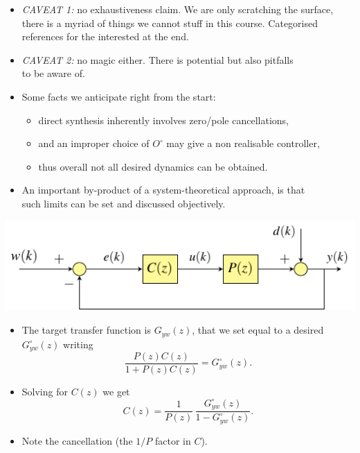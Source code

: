 \begin{frame}
\myPause
 \begin{itemize}[<+-| alert@+>]
 \item \emph{CAVEAT 1:} no exhaustiveness claim. We are only scratching the surface,\\
       there is a myriad of things we cannot stuff in this course. Categorised\\
       references for the interested at the end.
 \item \emph{CAVEAT 2:} no magic either. There is potential but also pitfalls\\
       to be aware of.
 \item Some facts we anticipate right from the start:
       \begin{itemize}[<+-| alert@+>]
       \item direct synthesis inherently involves zero/pole cancellations,
       \item and an improper choice of $O^{\circ}$ may give a non realisable controller,
       \item thus overall not all desired dynamics can be obtained.
       \end{itemize}
 \item \vfill An important by-product of a system-theoretical approach, is that\\
       such limits can be set and discussed objectively.
 \end{itemize}
\end{frame}

\begin{frame}
\framesubtitleTC{}
\myPause
 \begin{center}
  \includegraphics[width=0.50\columnwidth]{./Unit-04/img/ControlLoop-H1.pdf}
 \end{center}
 \begin{itemize}[<+-| alert@+>]
 \item The target transfer function is $G_{yw}(z)$, that we set equal to a desired $G_{yw}^{\circ}(z)$ writing
       \begin{displaymath} 
       \frac{P(z)C(z)}{1+P(z)C(z)} = G_{yw}^{\circ}(z).
       \end{displaymath}
 \item Solving for $C(z)$ we get
       \begin{displaymath} 
        C(z) = \frac{1}{P(z)} \, \frac{G_{yw}^{\circ}(z)}{1-G_{yw}^{\circ}(z)}.
       \end{displaymath}
 \item Note the cancellation (the $1/P$ factor in $C$).
 \end{itemize}
\end{frame}

